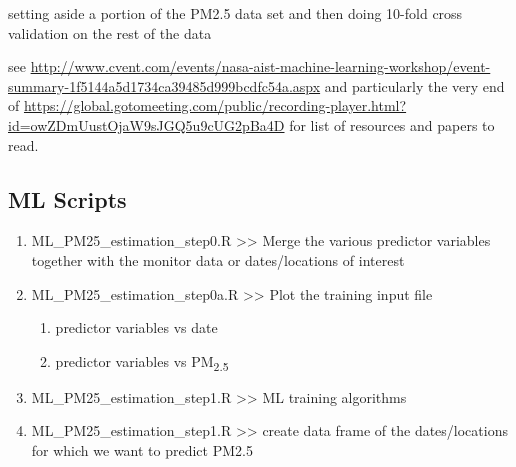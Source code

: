 
setting aside a portion of the PM2.5 data set and then doing 10-fold cross validation on the rest of the data

see \url{http://www.cvent.com/events/nasa-aist-machine-learning-workshop/event-summary-1f5144a5d1734ca39485d999bcdfc54a.aspx} and particularly the very end of \url{https://global.gotomeeting.com/public/recording-player.html?id=owZDmUustOjaW9sJGQ5u9cUG2pBa4D} for list of resources and papers to read.


\subsection{ML Scripts}

\begin{enumerate}

\item ML\_PM25\_estimation\_step0.R >>  Merge the various predictor variables together with the monitor data or dates/locations of interest

\item ML\_PM25\_estimation\_step0a.R >> Plot the training input file
	\begin{enumerate}
		\item predictor variables vs date
		\item predictor variables vs PM\textsubscript{2.5}
	\end{enumerate}

\item ML\_PM25\_estimation\_step1.R >> ML training algorithms

\item ML\_PM25\_estimation\_step1.R >> create data frame of the dates/locations for which we want to predict PM2.5

\end{enumerate}